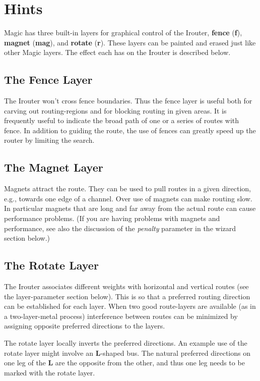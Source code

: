 \documentclass[letterpaper,twoside,12pt]{article}
\begin{document}
\section{Hints}

Magic has three built-in layers for graphical 
control of the Irouter, {\bfseries fence} ({\bfseries f}), 
{\bfseries magnet} ({\bfseries mag}), and {\bfseries rotate}
({\bfseries r}).  These layers
can be painted and erased just like other Magic layers.  The effect 
each has on the Irouter is described below.

\subsection{The Fence Layer}

The Irouter won't cross fence boundaries.  Thus the fence layer is useful
both for carving out routing-regions and for blocking routing in given
areas.  It is frequently useful to indicate the broad path of one or
a series of routes with fence.  In addition to guiding the route, the
use of fences can greatly speed up the router by limiting the search.

\subsection{The Magnet Layer}

Magnets attract the route.  They can be used to pull routes in a
given direction, e.g., towards one edge of a channel.  Over use of
magnets can make routing slow.  In particular magnets that are long and
far away from the actual route can cause performance problems.  (If
you are having problems with magnets and performance, see also the 
discussion of the {\itshape penalty} parameter in the wizard section below.)

\subsection{The Rotate Layer}

The Irouter associates different weights with horizontal and vertical
routes (see the layer-parameter section below).  This is so that 
a preferred routing direction can be established for each layer.  When
two good route-layers are available (as in a two-layer-metal process)
interference between routes can be minimized by assigning opposite
preferred directions to the layers.

The rotate layer locally inverts the preferred directions.  An example
use of the rotate layer might involve an {\bfseries L}-shaped bus.
The natural preferred directions on one leg of the {\bfseries L} are the opposite
from the other, and thus one leg needs to be 
marked with the rotate layer.
\end{document}
